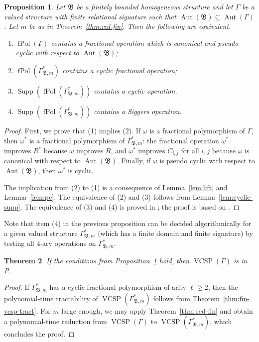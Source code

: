 \documentclass[nonacm]{acmart}
\newcommand{\bB}{{\mathfrak B}}
\DeclareMathOperator{\Aut}{Aut}
\DeclareMathOperator{\fPol}{fPol}
\DeclareMathOperator{\VCSP}{VCSP}
\DeclareMathOperator{\Sup}{Supp}
\newtheorem{theorem}{Theorem}[section]
\newtheorem{proposition}[theorem]{Proposition}
\begin{document}
\begin{proposition}\label{prop:black-box}
Let $\bB$ be a finitely bounded homogeneous structure 
and let $\Gamma$ be a valued structure with finite relational signature such that
$\Aut(\bB) \subseteq \Aut(\Gamma)$. Let $m$ be as in Theorem~\ref{thm:red-fin}.
Then the following are equivalent. 
\begin{enumerate}
\item $\fPol(\Gamma)$ contains a fractional operation which is canonical and pseudo cyclic with respect to $\Aut(\bB)$;  
\item $\fPol(\Gamma^*_{\bB,m})$ contains a cyclic fractional operation; 
\item $\Sup(\fPol(\Gamma^*_{\bB,m}))$ contains a cyclic operation.
\item $\Sup(\fPol(\Gamma^*_{\bB,m}))$ contains a Siggers operation.  
\end{enumerate}
\end{proposition}
\begin{proof}
First, we prove that (1) implies (2). 
If $\omega$ is a fractional polymorphism of 
$\Gamma$, then
$\omega^*$ is a fractional polymorphism of 
$\Gamma^*_{\bB,m}$: 
the fractional operation $\omega^*$ improves $R^*$ because $\omega$ improves $R$,
and
$\omega^*$ improves $C_{i,j}$ for all $i,j$ because $\omega$
is canonical with respect to $\Aut(\bB)$. 
Finally, if $\omega$ is pseudo cyclic with respect to $\Aut(\bB)$, then $\omega^*$ is cyclic. 


The implication from (2) to (1) is a consequence of Lemma~\ref{lem:lift} and Lemma~\ref{lem:pc}. 
The equivalence of (2) and (3) follows from Lemma~\ref{lem:cyclic-supp}. 
The equivalence of (3) and (4) is proved in \cite[Theorem 6.9.2]{Book}; the proof is based on \cite[Theorem 4.1]{Cyclic}.
\end{proof} 

Note that item (4) in the previous proposition can be decided algorithmically for a given valued structure $\Gamma^*_{\bB,m}$ (which has a finite domain
and finite signature) by testing all $4$-ary operations on $\Gamma^*_{\bB,m}$. 

\begin{theorem}\label{thm:tract}
If the conditions from Proposition~\ref{prop:black-box} 
hold, then $\VCSP(\Gamma)$ is in P. 
\end{theorem} 
\begin{proof}
If $\Gamma^*_{\bB,m}$ has a cyclic fractional polymorphism 
of arity $\ell \geq 2$, then the polynomial-time tractability of $\VCSP(\Gamma^*_{\bB,m})$ follows from Theorem~\ref{thm:fin-vcsp-tract}.
For $m$ large enough, we may apply Theorem~\ref{thm:red-fin}
and obtain a polynomial-time reduction from $\VCSP(\Gamma)$ 
to $\VCSP(\Gamma^*_{\bB,m})$, which concludes the proof. 
\end{proof}
\end{document}
